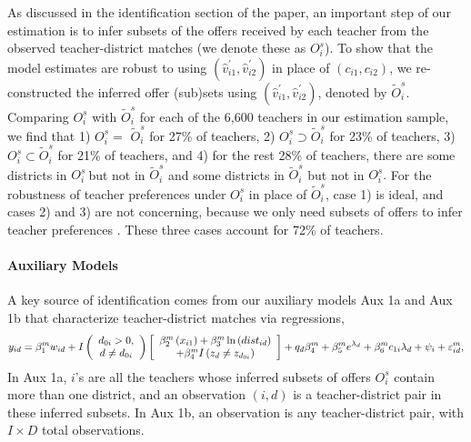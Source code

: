 \documentclass[notitlepage,12pt]{article}%
\begin{document}
As discussed in the identification section of the paper, an important step of
our estimation is to infer subsets of the offers received by each teacher from
the observed teacher-district matches (we denote these as $O_{i}^{s}$). To
show that the model estimates are robust to using $\left(  \hat{v}%
_{i1}^{\prime},\hat{v}_{i2}^{\prime}\right)  $ in place of $\left(
c_{i1},c_{i2}\right)  $, we re-constructed the inferred offer (sub)sets using
$\left(  \hat{v}_{i1}^{\prime},\hat{v}_{i2}^{\prime}\right)  $, denoted by
$\widetilde{O}_{i}^{s}$. Comparing $O_{i}^{s}$ with $\widetilde{O}_{i}^{s}$
for each of the 6,600 teachers in our estimation sample, we find that 1)
$O_{i}^{s}=$ $\widetilde{O}_{i}^{s}$ for 27\% of teachers, 2) $O_{i}%
^{s}\supset\widetilde{O}_{i}^{s}$ for 23\% of teachers, 3) $O_{i}^{s}%
\subset\widetilde{O}_{i}^{s}$ for 21\% of teachers, and 4) for the rest 28\%
of teachers, there are some districts in $O_{i}^{s}\ $but not in
$\widetilde{O}_{i}^{s}$ and some districts in $\widetilde{O}_{i}^{s}$ but not
in $O_{i}^{s}.$ For the robustness of teacher preferences under $O_{i}^{s}$ in
place of $\widetilde{O}_{i}^{s}$, case 1) is ideal, and cases 2) and 3) are
not concerning, because we only need subsets of offers to infer teacher
preferences \citep{fox2007semiparametric}. These three cases account for 72\%
of teachers.

\paragraph{Auxiliary Models}

A key source of identification comes from our auxiliary models Aux 1a and Aux
1b that characterize teacher-district matches via regressions,
\[
y_{id}=\beta_{1}^{m}w_{id}+I\left(
\begin{array}
[c]{c}%
d_{0i}>0,\\
d\neq d_{0i}%
\end{array}
\right)  \left[
\begin{array}
[c]{c}%
\beta_{2}^{m}\left(  x_{i1}\right)  +\beta_{3}^{m}\ln\left(  dist_{id}\right)
\\
+\beta_{4}^{m}I\left(  z_{d}\neq z_{d_{0i}}\right)
\end{array}
\right]  +q_{d}\beta_{4}^{m}+\beta_{5}^{m}e^{{\small \lambda}_{d}}+\beta
_{6}^{m}c_{1i}\lambda_{d}+\psi_{i}+\varepsilon_{id}^{m},
\]
In Aux 1a, $i$'s are all the teachers whose inferred subsets of offers
$O_{i}^{s}$ contain more than one district, and an observation $(i,d)$ is a
teacher-district pair in these inferred subsets$.$ In Aux 1b, an observation
is any teacher-district pair, with $I\times D$ total observations.
\end{document}
